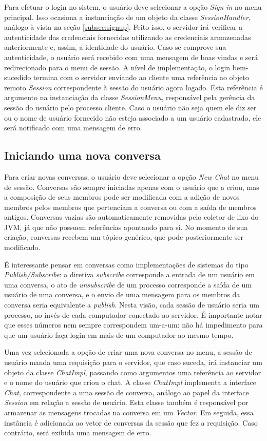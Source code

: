 \documentclass[../main.tex]{subfiles}
\begin{document}
Para efetuar o login no sistem, o usuário deve selecionar a opção \textit{Sign in} no menu principal.
Isso ocasiona a instanciação de um objeto da classe \textit{SessionHandler}, análogo à vista na seção \ref{subsec:signup}.
Feito isso, o servidor irá verificar a autenticidade das credenciais fornecidas utilizando as credenciais armazenadas anteriormente e, assim, a identidade do usuário.
Caso se comprove sua autenticidade, o usuário será recebido com uma mensagem de boas vindas e será redirecionado para o menu de sessão.
A nível de implementação, o login bem-sucedido termina com o servidor enviando ao cliente uma referência ao objeto remoto \textit{Session} correspondente à sessão do usuário agora logado.
Esta referência é argumento na instanciação da classe \textit{SessionMenu}, responsável pela gerência da sessão do usuário pelo processo cliente.
Caso o usuário não seja quem ele diz ser ou o nome de usuário fornecido não esteja associado a um usuário cadastrado, ele será notificado com uma mensagem de erro.

\subsection{Iniciando uma nova conversa}

Para criar novas conversas, o usuário deve selecionar a opção \textit{New Chat} no menu de sessão.
Conversas são sempre iniciadas apenas com o usuário que a criou, mas a composição de seus membros pode ser modificada com a adição de novos membros pelos membros que pertenciam a conversa ou com a saída de membros antigos.
Conversas vazias são automaticamente removidas pelo coletor de lixo do JVM, já que não possuem referências apontando para si.
No momento de sua criação, conversas recebem um tópico genérico, que pode posteriormente ser modificado.

É interessante pensar em conversas como implementações de sistemas do tipo \textit{Publish/Subscribe}: a diretiva \textit{subscribe} corresponde a entrada de um usuário em uma conversa, o ato de \textit{unsubscribe} de um processo corresponde a saída de um usuário de uma conversa, e o envio de uma mensagem para os membros da conversa seria equivalente a \textit{publish}.
Nesta visão, cada sessão de usuário seria um processo, ao invés de cada computador conectado ao servidor.
É importante notar que esses números nem sempre correspondem um-a-um: não há impedimento para que um usuário faça login em mais de um computador ao mesmo tempo.

Uma vez selecionada a opção de criar uma nova conversa no menu, a sessão de usuário manda uma requisição para o servidor, que caso suceda, irá instanciar um objeto da classe \textit{ChatImpl}, passando como argumentos uma referência ao servidor e o nome do usuário que criou o chat.
A classe \textit{ChatImpl} implementa a interface \textit{Chat}, correspondente a uma sessão de conversa, análogo ao papel da interface \textit{Session} em relação a sessão de usuário.
Esta classe também é responsável por armazenar as mensagens trocadas na conversa em um \textit{Vector}.
Em seguida, essa instância é adicionada ao vetor de conversas da sessão que fez a requisição.
Caso contrário, será exibida uma mensagem de erro.
\end{document}
